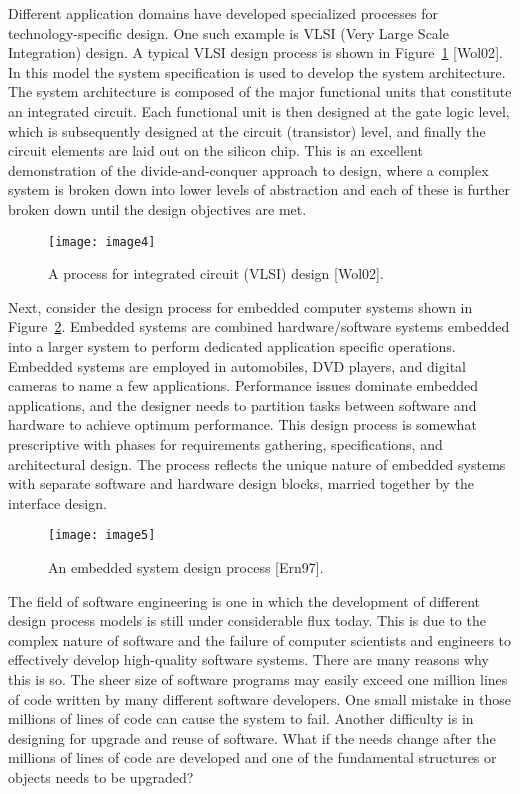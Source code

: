 Different application domains have developed specialized processes for
technology-specific design. One such example is VLSI (Very Large Scale
Integration) design. A typical VLSI design process is shown in Figure~\ref{figure:VLSIdesign}
 {[}Wol02{]}. In this model the system specification is used to
develop the system architecture. The system architecture is composed of
the major functional units that constitute an integrated circuit. Each
functional unit is then designed at the gate logic level, which is
subsequently designed at the circuit (transistor) level, and finally the
circuit elements are laid out on the silicon chip. This is an excellent
demonstration of the divide-and-conquer approach to design, where a
complex system is broken down into lower levels of abstraction and each
of these is further broken down until the design objectives are met.

\begin{figure}
 \texttt{[image: image4]}
\caption{A process for integrated circuit (VLSI) design {[}Wol02{]}.}
\label{figure:VLSIdesign}
\end{figure}

Next, consider the design process for embedded computer systems shown in
Figure~\ref{figure:embedded DesignProcess}. 
Embedded systems are combined hardware/software systems
embedded into a larger system to perform dedicated application specific
operations. Embedded systems are employed in automobiles, DVD players,
and digital cameras to name a few applications. Performance issues
dominate embedded applications, and the designer needs to partition
tasks between software and hardware to achieve optimum performance. This
design process is somewhat prescriptive with phases for requirements
gathering, specifications, and architectural design. The process
reflects the unique nature of embedded systems with separate software
and hardware design blocks, married together by the interface design.

\begin{figure}
\texttt{[image: image5]}
\caption{An embedded system design process {[}Ern97{]}.}
\label{figure:embedded DesignProcess}
\end{figure}

The field of software engineering is one in which the development of
different design process models is still under considerable flux today.
This is due to the complex nature of software and the failure of
computer scientists and engineers to effectively develop high-quality
software systems. There are many reasons why this is so. The sheer size
of software programs may easily exceed one million lines of code written
by many different software developers. One small mistake in those
millions of lines of code can cause the system to fail. Another
difficulty is in designing for upgrade and reuse of software. What if
the needs change after the millions of lines of code are developed and
one of the fundamental structures or objects needs to be upgraded?

